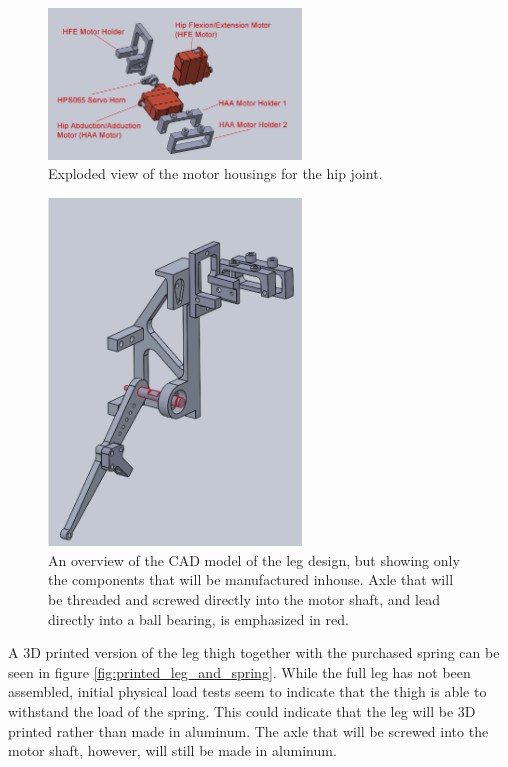 \begin{figure}[h!]
    \centering
    \includegraphics[width=0.6\textwidth]{Images/exploded_motor_holder_hip.png}
    \caption{Exploded view of the motor housings for the hip joint.}
    \label{fig:exploded_motor_housing_hip}
\end{figure}

\begin{figure}[h!]
    \centering
    \includegraphics[width=0.6\textwidth]{Images/manufacture_only2.png}
    \caption{An overview of the CAD model of the leg design, but showing only the components that will be manufactured inhouse. Axle that will be threaded and screwed directly into the motor shaft, and lead directly into a ball bearing, is emphasized in red. }
    \label{fig:manufacture_only}
\end{figure}

A 3D printed version of the leg thigh together with the purchased spring can be seen in figure \ref{fig:printed_leg_and_spring}. While the full leg has not been assembled, initial physical load tests seem to indicate that the thigh is able to withstand the load of the spring. This could indicate that the leg will be 3D printed rather than made in aluminum. The axle that will be screwed into the motor shaft, however, will still be made in aluminum. 

